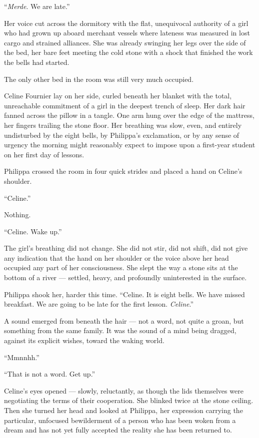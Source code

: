 \enquote{\textit{Merde}. We are late.}

Her voice cut across the dormitory with the flat, unequivocal authority of a girl who had grown up aboard merchant vessels where lateness was measured in lost cargo and strained alliances. She was already swinging her legs over the side of the bed, her bare feet meeting the cold stone with a shock that finished the work the bells had started.

The only other bed in the room was still very much occupied.

Celine Fournier lay on her side, curled beneath her blanket with the total, unreachable commitment of a girl in the deepest trench of sleep. Her dark hair fanned across the pillow in a tangle. One arm hung over the edge of the mattress, her fingers trailing the stone floor. Her breathing was slow, even, and entirely undisturbed by the eight bells, by Philippa's exclamation, or by any sense of urgency the morning might reasonably expect to impose upon a first-year student on her first day of lessons.

Philippa crossed the room in four quick strides and placed a hand on Celine's shoulder.

\enquote{Celine.}

Nothing.

\enquote{Celine. Wake up.}

The girl's breathing did not change. She did not stir, did not shift, did not give any indication that the hand on her shoulder or the voice above her head occupied any part of her consciousness. She slept the way a stone sits at the bottom of a river --- settled, heavy, and profoundly uninterested in the surface.

Philippa shook her, harder this time. \enquote{Celine. It is eight bells. We have missed breakfast. We are going to be late for the first lesson. \textit{Celine}.}

A sound emerged from beneath the hair --- not a word, not quite a groan, but something from the same family. It was the sound of a mind being dragged, against its explicit wishes, toward the waking world.

\enquote{Mmnnhh.}

\enquote{That is not a word. Get up.}

Celine's eyes opened --- slowly, reluctantly, as though the lids themselves were negotiating the terms of their cooperation. She blinked twice at the stone ceiling. Then she turned her head and looked at Philippa, her expression carrying the particular, unfocused bewilderment of a person who has been woken from a dream and has not yet fully accepted the reality she has been returned to.

